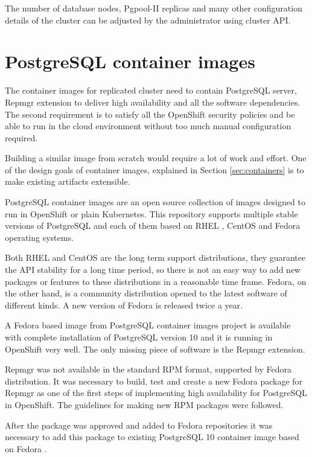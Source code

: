 \documentclass[
  digital, %
  twoside, %
  table,   %
  lof,     %
  lot,     %
]{fithesis3}
\begin{document}
The number of database nodes, Pgpool-II replicas and many other configuration details of the cluster can be adjusted by the administrator using cluster API.

\section{PostgreSQL container images} \label{sec:pg_cnt_images}
The container images for replicated cluster need to contain PostgreSQL server, Repmgr extension to deliver high availability and all the software dependencies. The second requirement is to satisfy all the OpenShift security policies and be able to run in the cloud environment without too much manual configuration required.

Building a similar image from scratch would require a lot of work and effort. One of the design goals of container images, explained in Section \ref{sec:containers} is to make existing artifacts extensible.

PostgreSQL container images \cite{pg_cnt} are an open source collection of images designed to run in OpenShift or plain Kubernetes. This repository supports multiple stable versions of PostgreSQL and each of them based on RHEL \cite{rhel}, CentOS \cite{centos} and Fedora \cite{getfedora} operating systems.

Both RHEL and CentOS are the long term support distributions, they guarantee the API stability for a long time period, so there is not an easy way to add new packages or features to these distributions in a reasonable time frame. Fedora, on the other hand, is a community distribution opened to the latest software of different kinds. A new version of Fedora is released twice a year.

A Fedora based image from PostgreSQL container images project is available with complete installation of PostgreSQL version 10 and it is running in OpenShift very well. The only missing piece of software is the Repmgr extension.

Repmgr was not available in the standard RPM \cite{rpm} format, supported by Fedora distribution. It was necessary to build, test and create a new Fedora package for Repmgr \cite{fedora_repmgr} as one of the first steps of implementing high availability for PostgreSQL in OpenShift. The guidelines for making new RPM packages \cite{fedora_new_package} were followed.

After the package was approved and added to Fedora repositories \cite{fedora_repositories} it was necessary to add this package to existing PostgreSQL 10 container image based on Fedora \cite{pg_img}.
\end{document}
